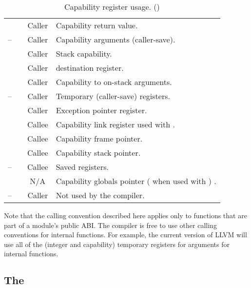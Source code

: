 \begin{table}
\begin{center}
\begin{tabu}{lccX}
			             &                     & Caller & Capability return value. \\
			--  &                     & Caller & Capability arguments (caller-save). \\
			            &            & Caller & Stack capability. \\
			            &                     & Caller &  destination register. \\
			            &                     & Caller & Capability to on-stack arguments. \\
			-- &                     & Caller & Temporary (caller-save) registers.\\
			            &                     & Caller & Exception pointer register. \\
			            &            & Callee & Capability link register used with .\\
			            &            & Callee & Capability frame pointer.\\
			            &            & Callee & Capability stack pointer.\\
			-- &                     & Callee & Saved registers. \\
			            &            & N/A & Capability globals pointer ( when used with ) .\\
			-- &                     & Caller & Not used by the compiler.\\
			\bottomrule
		\end{tabu}
		\caption{\label{tbl:purecapreguse}Capability register usage. (\sandboxABI)}
	\end{center}
\end{table}



Note that the calling convention described here applies only to functions that are part of a module's public ABI.
The compiler is free to use other calling conventions for internal functions.
For example, the current version of LLVM will use all of the (integer and
capability) temporary registers for arguments for internal functions.

\subsection{The \sandboxABI{}}

